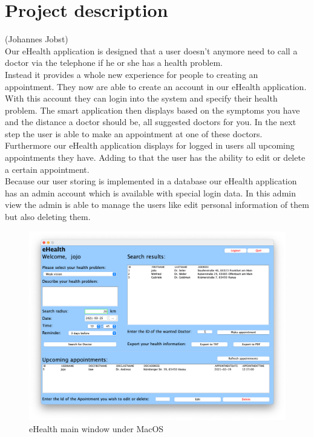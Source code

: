 \documentclass[a4paper, 12pt]{report}
\begin{document}
{\let\clearpage\relax \chapter{Project description}}
{\tiny (Johannes Jobst)\\}
Our eHealth application is designed that a user doesn't anymore need to call a doctor via the telephone if he or she has a  health problem. \\
Instead it provides a whole new experience for people to creating an appointment. They now are able to create an account in our eHealth application. With this account they can login into the system and specify their health problem. The smart application then displays based on the symptoms you have and  the distance a doctor should be, all suggested doctors for you. In the next step the user is able to make an appointment at one of these doctors. \\
Furthermore our eHealth application displays for logged in users all upcoming appointments they have. Adding to that the user has the ability to edit or delete a certain appointment.
\\
Because our user storing is implemented in a database our eHealth application has an admin account which is available with special login data. In this admin view the admin is able to manage the users like edit personal information of them but also deleting them.
\\
\begin{figure}[!h]
\includegraphics[width=\linewidth]{main.png} 
\caption{eHealth main window under MacOS}
\end{figure}
\end{document}
